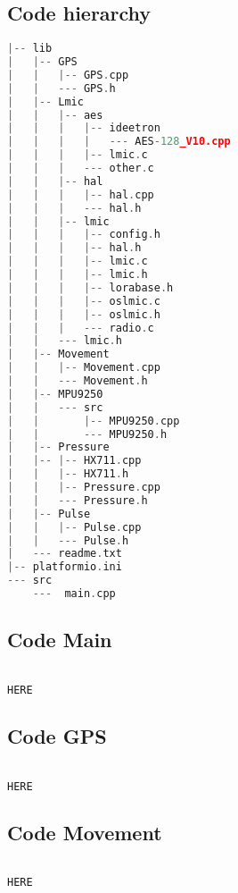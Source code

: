 \subsection{Code hierarchy}

\begin{lstlisting}[language=c,frame=tb,caption={Code hierarchy},label=lst:codehierarchy]
|-- lib
|   |-- GPS
|   |   |-- GPS.cpp
|   |   --- GPS.h
|   |-- Lmic
|   |   |-- aes
|   |   |   |-- ideetron
|   |   |   |   --- AES-128_V10.cpp
|   |   |   |-- lmic.c
|   |   |   --- other.c
|   |   |-- hal
|   |   |   |-- hal.cpp
|   |   |   --- hal.h
|   |   |-- lmic
|   |   |   |-- config.h
|   |   |   |-- hal.h
|   |   |   |-- lmic.c
|   |   |   |-- lmic.h
|   |   |   |-- lorabase.h
|   |   |   |-- oslmic.c
|   |   |   |-- oslmic.h
|   |   |   --- radio.c
|   |   --- lmic.h
|   |-- Movement
|   |   |-- Movement.cpp
|   |   --- Movement.h
|   |-- MPU9250
|   |   --- src
|   |       |-- MPU9250.cpp
|   |       --- MPU9250.h
|   |-- Pressure
|   |-- |-- HX711.cpp
|   |   |-- HX711.h
|   |   |-- Pressure.cpp
|   |   --- Pressure.h
|   |-- Pulse
|   |   |-- Pulse.cpp
|   |   --- Pulse.h
|   --- readme.txt
|-- platformio.ini
--- src
    ---  main.cpp
\end{lstlisting}

\subsection{Code Main}
\begin{lstlisting}[language=c,frame=tb,caption={Code GPS},label=lst:codegps]

HERE
\end{lstlisting}

\subsection{Code GPS}
\begin{lstlisting}[language=c,frame=tb,caption={Code GPS},label=lst:codegps]

HERE
\end{lstlisting}

\subsection{Code Movement}
\begin{lstlisting}[language=c,frame=tb,caption={Code Movement},label=lst:codemovement]

HERE
\end{lstlisting}

